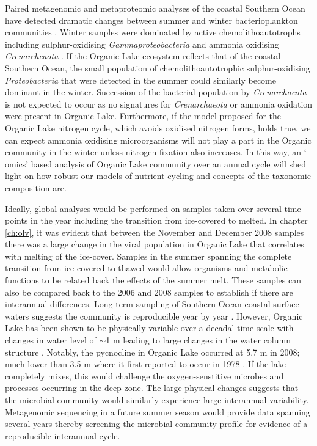 Paired metagenomic and metaproteomic analyses of the coastal Southern Ocean have detected dramatic changes between summer and winter bacterioplankton communities \cite{Grzymski2012, Williams2012a}.
Winter samples were dominated by active chemolithoautotrophs including sulphur-oxidising \emph{Gammaproteobacteria} and ammonia oxidising \emph{Crenarcheaota} \cite{Grzymski2012, Williams2012b}.
If the Organic Lake ecosystem reflects that of the coastal Southern Ocean, the small population of chemolithoautotrophic sulphur-oxidising \emph{Proteobacteria} that were detected in the summer could similarly become dominant in the winter.
Succession of the bacterial population by \emph{Crenarchaeota} is not expected to occur as no signatures for \emph{Crenarchaeota} or ammonia oxidation were present in Organic Lake.
Furthermore, if the model proposed for the Organic Lake nitrogen cycle, which avoids oxidised nitrogen forms, holds true, we can expect ammonia oxidising microorganisms will not play a part in the Organic community in the winter unless nitrogen fixation also increases.
In this way, an `-omics' based analysis of Organic Lake community over an annual cycle will shed light on how robust our models of nutrient cycling and concepts of the taxonomic composition are.

Ideally, global analyses would be performed on samples taken over several time points in the year including the transition from ice-covered to melted.
In chapter \ref{ch:olv}, it was evident that between the November and December 2008 samples there was a large change in the viral population in Organic Lake that correlates with melting of the ice-cover.
Samples in the summer spanning the complete transition from ice-covered to thawed would allow organisms and metabolic functions to be related back the effects of the summer melt.
These samples can also be compared back to the 2006 and 2008 samples to establish if there are interannual differences.
Long-term sampling of Southern Ocean coastal surface waters suggests the community is reproducible year by year \cite{Murray2007}.
However, Organic Lake has been shown to be physically variable over a decadal time scale with changes in water level of $\sim$1 m leading to large changes in the water column structure \cite{Gibson1995, Gibson1996}.
Notably, the pycnocline in Organic Lake occurred at 5.7 m in 2008; much lower than 3.5 m where it first reported to occur in 1978 \cite{Franzmann1987b}.
If the lake completely mixes, this would challenge the oxygen-senstitive microbes and processes occurring in the deep zone.
The large physical changes suggests that the microbial community would similarly experience large interannual variability.
Metagenomic sequencing in a future summer season would provide data spanning several years thereby screening the microbial community profile for evidence of a reproducible interannual cycle.

